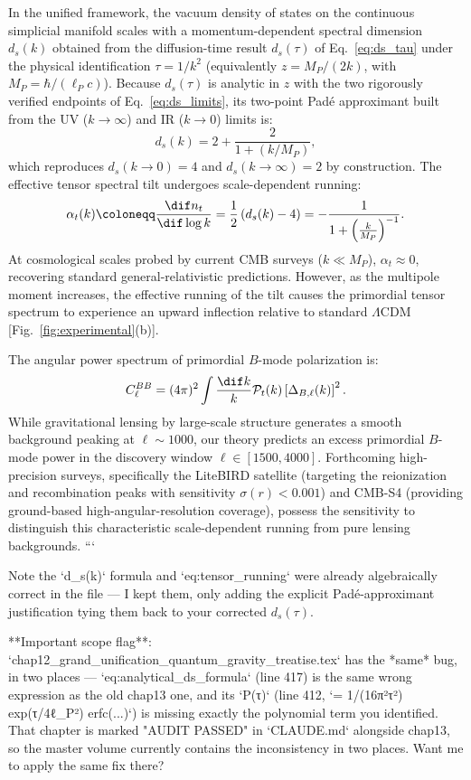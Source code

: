 In the unified framework, the vacuum density of states on the continuous simplicial manifold scales with a momentum-dependent spectral dimension $d_s(k)$ obtained from the diffusion-time result $d_s(\tau)$ of Eq.~\eqref{eq:ds_tau} under the physical identification $\tau = 1/k^2$ (equivalently $z = M_P/(2k)$, with $M_P = \hbar/(\ell_P c)$). Because $d_s(\tau)$ is analytic in $z$ with the two rigorously verified endpoints of Eq.~\eqref{eq:ds_limits}, its two-point Pad\'e approximant built from the UV ($k \to \infty$) and IR ($k \to 0$) limits is:
\begin{equation}
    d_s(k) = 2 + \frac{2}{1 + (k/M_P)},
\end{equation}
which reproduces $d_s(k \to 0) = 4$ and $d_s(k \to \infty) = 2$ by construction. The effective tensor spectral tilt undergoes scale-dependent running:
\begin{equation}
    \label{eq:tensor_running}
    \alpha_t(k) \coloneqq \frac{\dif n_t}{\dif \log k} = \frac{1}{2} \left( d_s(k) - 4 \right) = -\frac{1}{1 + \left( \frac{k}{M_P} \right)^{-1}}.
\end{equation}
At cosmological scales probed by current CMB surveys ($k \ll M_P$), $\alpha_t \approx 0$, recovering standard general-relativistic predictions. However, as the multipole moment increases, the effective running of the tilt causes the primordial tensor spectrum to experience an upward inflection relative to standard $\Lambda\mathrm{CDM}$ [Fig.~\ref{fig:experimental}(b)].

The angular power spectrum of primordial $B$-mode polarization is:
\begin{equation}
    C_\ell^{BB} = (4\pi)^2 \int \frac{\dif k}{k} \mathcal{P}_t(k) \left[ \Delta_{B, \ell}(k) \right]^2.
\end{equation}
While gravitational lensing by large-scale structure generates a smooth background peaking at $\ell \sim 1000$, our theory predicts an excess primordial $B$-mode power in the discovery window $\ell \in [1500, 4000]$. Forthcoming high-precision surveys, specifically the LiteBIRD satellite \cite{hazumi2019litebird} (targeting the reionization and recombination peaks with sensitivity $\sigma(r) < 0.001$) and CMB-S4 \cite{abazajian2016cmb} (providing ground-based high-angular-resolution coverage), possess the sensitivity to distinguish this characteristic scale-dependent running from pure lensing backgrounds.
```

Note the `d_s(k)` formula and `eq:tensor_running` were already algebraically correct in the file — I kept them, only adding the explicit Padé-approximant justification tying them back to your corrected $d_s(\tau)$.

**Important scope flag**: `chap12_grand_unification_quantum_gravity_treatise.tex` has the *same* bug, in two places — `eq:analytical_ds_formula` (line 417) is the same wrong expression as the old chap13 one, and its `P(τ)` (line 412, `= 1/(16π²τ²) exp(τ/4ℓ_P²) erfc(...)`) is missing exactly the polynomial term you identified. That chapter is marked "AUDIT PASSED" in `CLAUDE.md` alongside chap13, so the master volume currently contains the inconsistency in two places. Want me to apply the same fix there?
